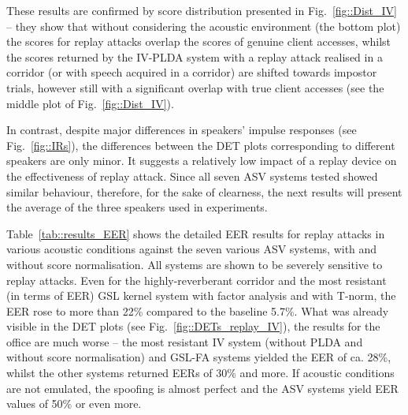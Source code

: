 These results are confirmed by score distribution presented in Fig.~\ref{fig::Dist_IV} -- they show that without considering the acoustic environment (the bottom plot) the scores for replay attacks overlap the scores of genuine client accesses, whilst the scores returned by the IV-PLDA system with a replay attack realised in a corridor (or with speech acquired in a corridor) are shifted towards impostor trials, however still with a significant overlap with true client accesses (see the middle plot of Fig.~\ref{fig::Dist_IV}).

In contrast, despite major differences in speakers' impulse responses (see Fig.~\ref{fig::IRs}), the differences between the DET plots corresponding to different speakers are only minor. It suggests a relatively low impact of a replay device on the effectiveness of replay attack. Since all seven ASV systems tested showed similar behaviour, therefore, for the sake of clearness, the next results will present the average of the three speakers used in experiments.




Table~\ref{tab::results_EER} shows the detailed EER results for replay attacks in various acoustic conditions against the seven various ASV systems, with and without score normalisation. All systems are shown to be severely sensitive to replay attacks. Even for the highly-reverberant corridor and the most resistant (in terms of EER) GSL kernel system with factor analysis and with T-norm, the EER rose to more than 22\% compared to the baseline 5.7\%. What was already visible in the DET plots (see Fig.~\ref{fig::DETs_replay_IV}), the results for the office are much worse -- the most resistant IV system (without PLDA and without score normalisation) and GSL-FA systems yielded the EER of ca. 28\%, whilst the other systems returned EERs of 30\% and more. If acoustic conditions are not emulated, the spoofing is almost perfect and the ASV systems yield EER values of 50\% or even more. 


